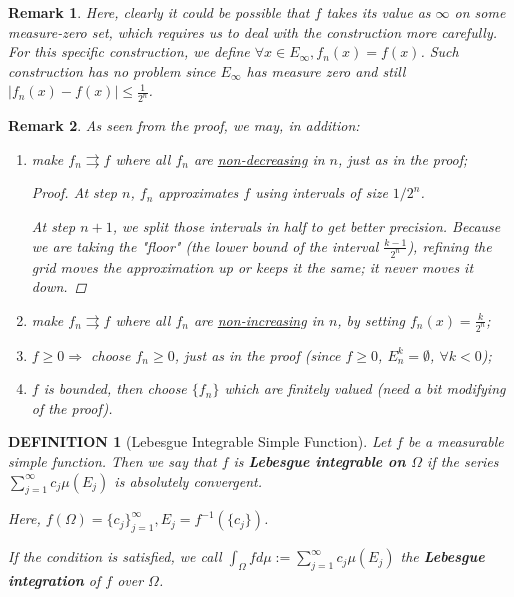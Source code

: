 \documentclass[12pt]{article}
\theoremstyle{blueplain}
\theoremstyle{bluedef}
\newtheorem{definition}{DEFINITION}[section]
\theoremstyle{blueremark}
\newtheorem{remark}{Remark}[section]
\numberwithin{equation}{section}
\begin{document}
\begin{remark}
  Here, clearly it could be possible that $f$ takes its value as $\infty$ on some measure-zero set, which requires us to deal with the construction more carefully. For this specific construction, we define $\forall x \in E_{\infty}, f_n(x) = f(x)$. Such construction has no problem since $E_\infty$ has measure zero and still $|f_n(x) - f(x)| \leq \frac{1}{2^n}$.
\end{remark}

\begin{remark}
  As seen from the proof, we may, in addition:

  \begin{enumerate}
    \item make $f_n \rightrightarrows f$ where all $f_n$ are \underline{non-decreasing} in $n$, just as in the proof;
          \begin{proof}
            At step $n$, $f_n$ approximates $f$ using intervals of size $1/2^n$.

            At step $n+1$, we split those intervals in half to get better precision. Because we are taking the "floor" (the lower bound of the interval $\frac{k-1}{2^n}$), refining the grid moves the approximation up or keeps it the same; it never moves it down.
          \end{proof}
    \item make $f_n \rightrightarrows f$ where all $f_n$ are \underline{non-increasing} in $n$, by setting $f_n(x) = \frac{k}{2^n}$;
    \item $f \geq 0 \Rightarrow$ choose $f_n \geq 0$, just as in the proof (since $f \geq 0$, $E_n^k = \emptyset$, $\forall k < 0$);
    \item $f$ is bounded, then choose $\{f_n\}$ which are finitely valued (need a bit modifying of the proof).
  \end{enumerate}
\end{remark}

\begin{definition}[Lebesgue Integrable Simple Function]

  Let $f$ be a measurable simple function. Then we say that $f$ is \textbf{Lebesgue integrable on $\Omega$} if the series $\sum_{j=1}^{\infty}c_j \mu(E_j)$ is absolutely convergent.

  Here, $f(\Omega) = \{c_j\}_{j=1}^\infty, E_j = f^{-1}(\{c_j\})$.

  If the condition is satisfied, we call $\int_{\Omega} f d\mu := \sum_{j=1}^{\infty}c_j \mu(E_j)$ the \textbf{Lebesgue integration} of $f$ over $\Omega$.
\end{definition}
\end{document}
